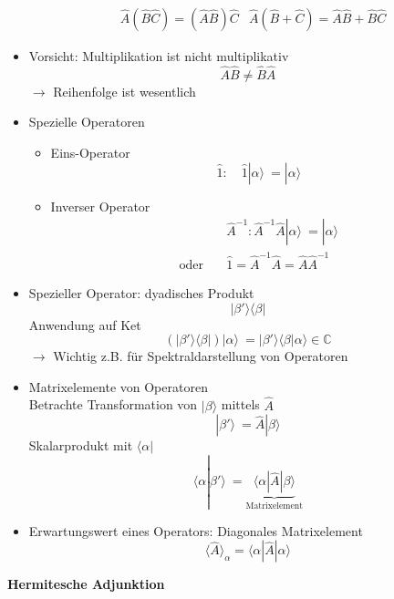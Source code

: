 \documentclass[10pt,article,colorback,accentcolor=tud9d]{scrartcl}
\begin{document}
\begin{itemize}
\begin{equation}
\begin{aligned}
  &\hat{A}(\hat{B} \hat{C}) = (\hat{A} \hat{B})\hat{C}
  &\hat{A}(\hat{B} + \hat{C}) = \hat{A}\hat{B} + \hat{B}\hat{C}
\end{aligned}
\end{equation}
\item Vorsicht: Multiplikation ist nicht multiplikativ
\begin{equation}
\hat{A}\hat{B} \not= \hat{B}\hat{A}
\end{equation}
$\rightarrow$ Reihenfolge ist wesentlich
\item Spezielle Operatoren
  \begin{itemize}
  \item Eins-Operator 
   \begin{equation}
  \hat{1}: \quad \hat{1}\left|\right. \alpha \rangle  \ = \left|\right. \alpha \rangle 
  \end{equation}
  \item Inverser Operator 
  \begin{equation}
  \begin{aligned}
  &\hat{A}^{-1}: {\hat{A}}^{-1} \hat{A}\left|\right. \alpha \rangle  \ = \left|\right
. \alpha \rangle \\
  \text{oder} \quad &\hat{1} = {\hat{A}}^{-1}\hat{A} = \hat{A} {\hat{A}}^{-1}
  \end{aligned}
  \end{equation}
  \end{itemize}
\item Spezieller Operator: dyadisches Produkt
  \begin{equation}
  \left|\right. \beta' \rangle \langle \beta\left|\right.
  \end{equation}
  Anwendung auf Ket
  \begin{equation}
  (\left|\right. \beta' \rangle \langle \beta\left|\right.)\left|\right.\alpha\rangle  \ = \left|
\right.\beta'\rangle \langle \beta\left|\right.\alpha\rangle  \in \mathbb{C}
  \end{equation}
  $\rightarrow$ Wichtig z.B. für Spektraldarstellung von Operatoren
\item Matrixelemente von Operatoren\\
  Betrachte Transformation von $\left|\right. \beta \rangle $ mittels $\hat{A}$
  \begin{equation}
  \left|\right. \beta'\rangle  \ = \hat{A}\left|\right. \beta\rangle 
  \end{equation}
  Skalarprodukt mit $\langle \alpha \left|\right.$
  \begin{equation}
  \langle \alpha\left|\right.\beta'\rangle  \ = \underbrace{\langle \alpha\left|\right.\hat{A}\left
|\right.\beta\rangle }_{\text{Matrixelement}}
  \end{equation}
\item Erwartungswert eines Operators: Diagonales Matrixelement
  \begin{equation}
  \langle \hat{A}\rangle _\alpha = \langle \alpha \left|\right.\hat{A}\left.\right| \alpha\rangle 
  \end{equation}
 
\end{itemize}
\textbf{Hermitesche Adjunktion}
 
\end{document}
